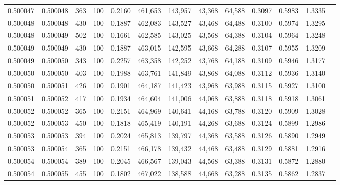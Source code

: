 \begin{tabular}{rrrrrrrrrrrrr}
0.500047 & 0.500048 &   363 & 100 &                                     0.2160 & 461,653 & 143,957 &  43,368 &  64,588 & 0.3097 & 0.5983 & 1.3335 \\
0.500048 & 0.500048 &   430 & 100 &                                     0.1887 & 462,083 & 143,527 &  43,468 &  64,488 & 0.3100 & 0.5974 & 1.3295 \\
0.500048 & 0.500049 &   502 & 100 &                                     0.1661 & 462,585 & 143,025 &  43,568 &  64,388 & 0.3104 & 0.5964 & 1.3248 \\
0.500049 & 0.500049 &   430 & 100 &                                     0.1887 & 463,015 & 142,595 &  43,668 &  64,288 & 0.3107 & 0.5955 & 1.3209 \\
0.500049 & 0.500050 &   343 & 100 &                                     0.2257 & 463,358 & 142,252 &  43,768 &  64,188 & 0.3109 & 0.5946 & 1.3177 \\
0.500050 & 0.500050 &   403 & 100 &                                     0.1988 & 463,761 & 141,849 &  43,868 &  64,088 & 0.3112 & 0.5936 & 1.3140 \\
0.500050 & 0.500051 &   426 & 100 &                                     0.1901 & 464,187 & 141,423 &  43,968 &  63,988 & 0.3115 & 0.5927 & 1.3100 \\
0.500051 & 0.500052 &   417 & 100 &                                     0.1934 & 464,604 & 141,006 &  44,068 &  63,888 & 0.3118 & 0.5918 & 1.3061 \\
0.500052 & 0.500052 &   365 & 100 &                                     0.2151 & 464,969 & 140,641 &  44,168 &  63,788 & 0.3120 & 0.5909 & 1.3028 \\
0.500052 & 0.500053 &   450 & 100 &                                     0.1818 & 465,419 & 140,191 &  44,268 &  63,688 & 0.3124 & 0.5899 & 1.2986 \\
0.500053 & 0.500053 &   394 & 100 &                                     0.2024 & 465,813 & 139,797 &  44,368 &  63,588 & 0.3126 & 0.5890 & 1.2949 \\
0.500053 & 0.500054 &   365 & 100 &                                     0.2151 & 466,178 & 139,432 &  44,468 &  63,488 & 0.3129 & 0.5881 & 1.2916 \\
0.500054 & 0.500054 &   389 & 100 &                                     0.2045 & 466,567 & 139,043 &  44,568 &  63,388 & 0.3131 & 0.5872 & 1.2880 \\
0.500054 & 0.500055 &   455 & 100 &                                     0.1802 & 467,022 & 138,588 &  44,668 &  63,288 & 0.3135 & 0.5862 & 1.2837 \\

\end{tabular}
